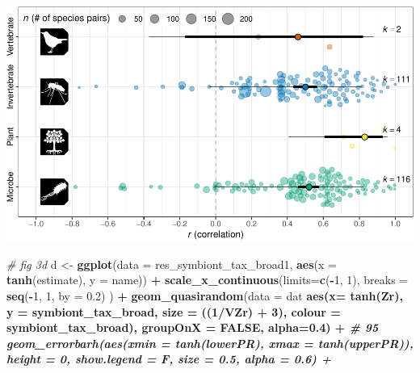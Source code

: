 \documentclass[
]{article}
\newenvironment{Shaded}{\begin{snugshade}}{\end{snugshade}}
\newcommand{\CommentTok}[1]{\textcolor[rgb]{0.56,0.35,0.01}{\textit{#1}}}
\newcommand{\DataTypeTok}[1]{\textcolor[rgb]{0.13,0.29,0.53}{#1}}
\newcommand{\DecValTok}[1]{\textcolor[rgb]{0.00,0.00,0.81}{#1}}
\newcommand{\FloatTok}[1]{\textcolor[rgb]{0.00,0.00,0.81}{#1}}
\newcommand{\KeywordTok}[1]{\textcolor[rgb]{0.13,0.29,0.53}{\textbf{#1}}}
\newcommand{\NormalTok}[1]{#1}
\newcommand{\OperatorTok}[1]{\textcolor[rgb]{0.81,0.36,0.00}{\textbf{#1}}}
\newcommand{\OtherTok}[1]{\textcolor[rgb]{0.56,0.35,0.01}{#1}}
\newcommand{\StringTok}[1]{\textcolor[rgb]{0.31,0.60,0.02}{#1}}
\begin{document}
\includegraphics{Supporting_Information_files/figure-latex/unnamed-chunk-22-1.pdf}

\begin{Shaded}
\begin{Highlighting}[]
\CommentTok{# fig 3d}
\NormalTok{d <-}\StringTok{ }\KeywordTok{ggplot}\NormalTok{(}\DataTypeTok{data =}\NormalTok{ res_symbiont_tax_broad1, }\KeywordTok{aes}\NormalTok{(}\DataTypeTok{x =} \KeywordTok{tanh}\NormalTok{(estimate), }\DataTypeTok{y =}\NormalTok{ name)) }\OperatorTok{+}
\StringTok{  }\KeywordTok{scale_x_continuous}\NormalTok{(}\DataTypeTok{limits=}\KeywordTok{c}\NormalTok{(}\OperatorTok{-}\DecValTok{1}\NormalTok{, }\DecValTok{1}\NormalTok{), }\DataTypeTok{breaks =} \KeywordTok{seq}\NormalTok{(}\OperatorTok{-}\DecValTok{1}\NormalTok{, }\DecValTok{1}\NormalTok{, }\DataTypeTok{by =} \FloatTok{0.2}\NormalTok{) ) }\OperatorTok{+}
\StringTok{  }\KeywordTok{geom_quasirandom}\NormalTok{(}\DataTypeTok{data =}\NormalTok{ dat }\OperatorTok{%
                   \KeywordTok{aes}\NormalTok{(}\DataTypeTok{x=} \KeywordTok{tanh}\NormalTok{(Zr), }\DataTypeTok{y =}\NormalTok{ symbiont_tax_broad, }\DataTypeTok{size =}\NormalTok{ ((}\DecValTok{1}\OperatorTok{/}\NormalTok{VZr) }\OperatorTok{+}\StringTok{ }\DecValTok{3}\NormalTok{), }\DataTypeTok{colour =}\NormalTok{ symbiont_tax_broad), }\DataTypeTok{groupOnX =} \OtherTok{FALSE}\NormalTok{, }\DataTypeTok{alpha=}\FloatTok{0.4}\NormalTok{) }\OperatorTok{+}\StringTok{ }
\StringTok{  }\CommentTok{# 95 %
\StringTok{  }\KeywordTok{geom_errorbarh}\NormalTok{(}\KeywordTok{aes}\NormalTok{(}\DataTypeTok{xmin =} \KeywordTok{tanh}\NormalTok{(lowerPR), }\DataTypeTok{xmax =} \KeywordTok{tanh}\NormalTok{(upperPR)),  }\DataTypeTok{height =} \DecValTok{0}\NormalTok{, }\DataTypeTok{show.legend =}\NormalTok{ F, }\DataTypeTok{size =} \FloatTok{0.5}\NormalTok{, }\DataTypeTok{alpha =} \FloatTok{0.6}\NormalTok{) }\OperatorTok{+}
}}
\end{Highlighting}
\end{Shaded}
\end{document}
